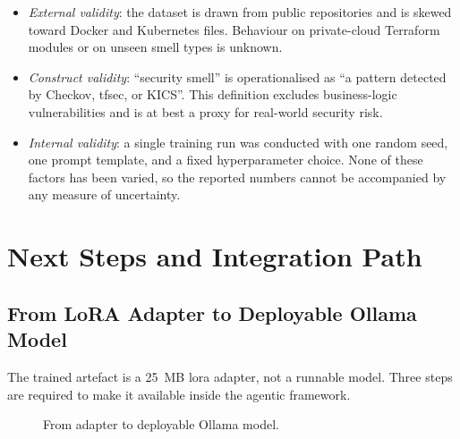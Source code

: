 \documentclass[12pt, a4paper]{report}
\begin{document}
\begin{itemize}
  \item \emph{External validity}: the dataset is drawn from public
        repositories and is skewed toward Docker and Kubernetes files.
        Behaviour on private-cloud Terraform modules or on unseen
        smell types is unknown.
  \item \emph{Construct validity}: ``security smell'' is operationalised
        as ``a pattern detected by Checkov, tfsec, or KICS''. This
        definition excludes business-logic vulnerabilities and is at
        best a proxy for real-world security risk.
  \item \emph{Internal validity}: a single training run was conducted
        with one random seed, one prompt template, and a fixed
        hyperparameter choice. None of these factors has been varied,
        so the reported numbers cannot be accompanied by any measure of
        uncertainty.
\end{itemize}

\chapter{Next Steps and Integration Path}
\label{ch:next}

\section{From LoRA Adapter to Deployable Ollama Model}

The trained artefact is a 25~MB \gls{lora} adapter, not a runnable model.
Three steps are required to make it available inside the agentic
framework.

\begin{figure}[H]
  \centering
  \caption{From adapter to deployable Ollama model.}
  \label{fig:integration-path}
\end{figure}
\end{document}

